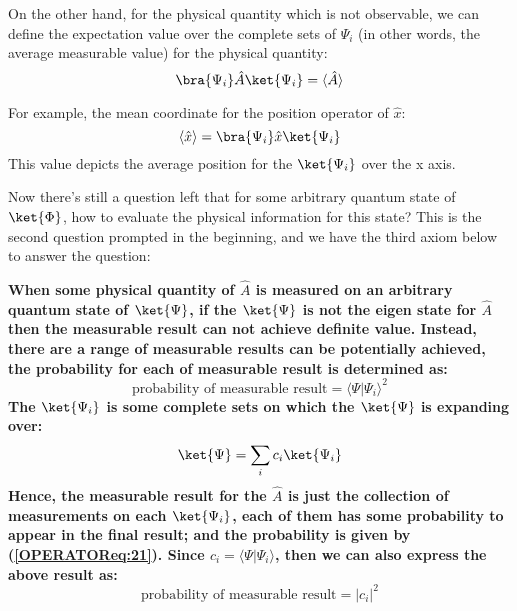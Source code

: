 On the other hand, for the physical quantity which is not
observable, we can define the expectation value over the complete
sets of $\Psi_{i}$ (in other words, the average measurable value)
for the physical quantity:
\begin{equation}\label{OPERATOReq:7}
\bra{\Psi_{i}}\hat{A}\ket{\Psi_{i}} = \langle\hat{A}\rangle
\end{equation}

For example, the mean coordinate for the position operator of
$\hat{x}$:
\begin{equation}\label{}
\langle\hat{x}\rangle = \bra{\Psi_{i}}\hat{x}\ket{\Psi_{i}}
\end{equation}
This value depicts the average position for the $\ket{\Psi_{i}}$ over
the x axis.

Now there's still a question left that for some arbitrary quantum
state of $\ket{\Phi}$, how to evaluate the physical information for
this state? This is the second question prompted in the beginning, and
we have the third axiom below to answer the question:
\begin{axiom}\label{axiom4}
  \textbf{When some physical quantity of $\hat{A}$ is measured on an
    arbitrary quantum state of $\ket{\Psi}$, if the $\ket{\Psi}$ is
    not the eigen state for $\hat{A}$ then the measurable result can
    not achieve definite value. Instead, there are a range of
    measurable results can be potentially achieved, the probability
    for each of measurable result is determined as:
    \begin{equation}
\label{OPERATOReq:21}
      \text{probability of measurable result} = \langle \Psi|\Psi_{i} \rangle^{2}
    \end{equation}
    The $\ket{\Psi_{i}}$ is some complete sets on which the
    $\ket{\Psi}$ is expanding over:
    \begin{equation}
      \ket{\Psi} = \sum_{i}c_{i}\ket{\Psi_{i}}
    \end{equation}
    Hence, the measurable result for the $\hat{A}$ is just the
    collection of measurements on each $\ket{\Psi_{i}}$, each of them
    has some probability to appear in the final result; and the
    probability is given by (\ref{OPERATOReq:21}). Since $c_{i} =
    \langle \Psi|\Psi_{i} \rangle$, then we can also express the above
    result as:
    \begin{equation}
      \text{probability of measurable result} = |c_{i}|^{2}
    \end{equation} }
\end{axiom}

